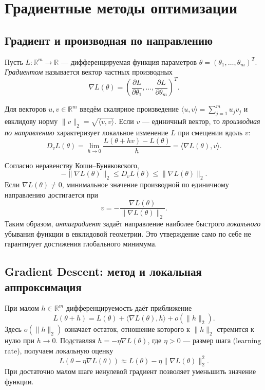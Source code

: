 \documentclass[12pt,a4paper]{article}
\newcommand{\R}{\mathbb{R}}
\begin{document}
\section{Градиентные методы оптимизации}

\subsection{Градиент и производная по направлению}

Пусть $L:\R^m\to\R$ --- дифференцируемая функция
параметров $\theta=(\theta_1,\ldots,\theta_m)^T$.
\emph{Градиентом} называется вектор частных производных
\[
    \nabla L(\theta)=
    \left(\frac{\partial L}{\partial\theta_1},\ldots,
    \frac{\partial L}{\partial\theta_m}\right)^T.
\]

Для векторов $u,v\in\R^m$ введём скалярное произведение
$\langle u,v\rangle=\sum_{j=1}^mu_jv_j$ и евклидову норму
$\|v\|_2=\sqrt{\langle v,v\rangle}$.
Если $v$ --- единичный вектор, то \emph{производная по направлению}
характеризует локальное изменение $L$ при смещении вдоль $v$:
\[
    D_vL(\theta)
    =\lim_{h\to0}\frac{L(\theta+hv)-L(\theta)}h
    =\langle\nabla L(\theta),v\rangle.
\]

Согласно неравенству Коши--Буняковского,
\[
    -\|\nabla L(\theta)\|_2
    \le D_vL(\theta)
    \le \|\nabla L(\theta)\|_2.
\]
Если $\nabla L(\theta)\ne0$, минимальное значение производной
по единичному направлению достигается при
\[
    v=-\frac{\nabla L(\theta)}{\|\nabla L(\theta)\|_2}.
\]
Таким образом, \emph{антиградиент} задаёт направление наиболее
быстрого \emph{локального} убывания функции в евклидовой геометрии.
Это утверждение само по себе не гарантирует достижения глобального минимума.

\subsection{Gradient Descent: метод и локальная аппроксимация}

При малом $h\in\R^m$ дифференцируемость даёт приближение
\begin{equation}
    L(\theta+h)=L(\theta)+\langle\nabla L(\theta),h\rangle
      +o(\|h\|_2).
    \label{eq:local-linear}
\end{equation}
Здесь $o(\|h\|_2)$ означает остаток, отношение которого к
$\|h\|_2$ стремится к нулю при $h\to0$.
Подставляя $h=-\eta\nabla L(\theta)$, где $\eta>0$ --- размер шага
(learning rate), получаем локальную оценку
\[
    L(\theta-\eta\nabla L(\theta))
    \approx L(\theta)-\eta\|\nabla L(\theta)\|_2^2.
\]
При достаточно малом шаге ненулевой градиент позволяет
уменьшить значение функции.
\end{document}
